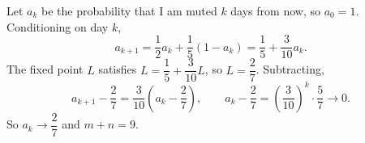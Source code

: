 Let $a_k$ be the probability that I am muted $k$ days from now, so $a_0=1$. Conditioning on day $k$,
\[a_{k+1}=\dfrac12a_k+\dfrac15(1-a_k)=\dfrac15+\dfrac{3}{10}a_k.\]
The fixed point $L$ satisfies $L=\dfrac15+\dfrac3{10}L$, so $L=\dfrac27$. Subtracting,
\[a_{k+1}-\dfrac27=\dfrac3{10}\left(a_k-\dfrac27\right),\qquad a_k-\dfrac27=\left(\dfrac3{10}\right)^k\cdot\dfrac57\to0.\]
So $a_k\to\dfrac27$ and $m+n=\boxed{9}$.

